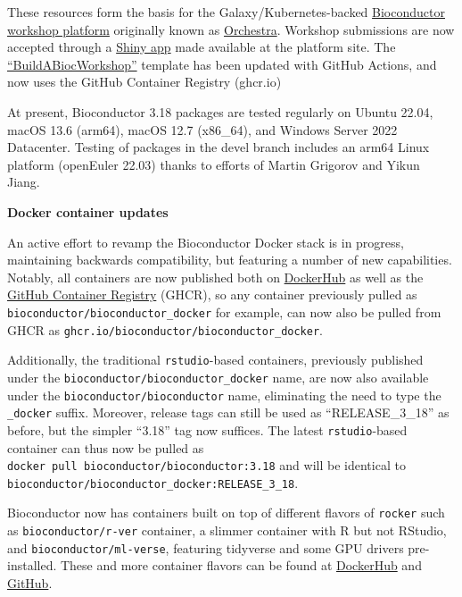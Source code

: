 These resources form the basis for the
Galaxy/Kubernetes-backed \href{https://workshop.bioconductor.org}{Bioconductor workshop platform}
originally known as \href{https://f1000research.com/articles/7-1656}{Orchestra}.
Workshop submissions are now
accepted through a \href{https://github.com/Bioconductor/BiocWorkshopSubmit}{Shiny app} made available at the platform site.
The \href{https://github.com/Bioconductor/BuildABiocWorkshop}{``BuildABiocWorkshop''}
template has been updated
with GitHub Actions, and now uses the GitHub Container Registry (ghcr.io)

At present, Bioconductor 3.18 packages are tested regularly on
Ubuntu 22.04, macOS 13.6 (arm64), macOS 12.7 (x86\_64), and Windows
Server 2022 Datacenter. Testing of packages in the devel branch
includes an arm64 Linux platform (openEuler 22.03) thanks to efforts
of Martin Grigorov and Yikun Jiang.

\textbf{Docker container updates}

An active effort to revamp the Bioconductor Docker stack is in progress, maintaining backwards compatibility, but featuring a number of new capabilities. Notably, all containers are now published both on
\href{https://hub.docker.com/u/bioconductor}{DockerHub} as well as the
\href{https://github.com/orgs/Bioconductor/packages?repo_name=bioconductor_docker}{GitHub Container Registry} (GHCR), so any container previously pulled as \texttt{bioconductor/bioconductor\_docker} for example, can now also be pulled from GHCR as \texttt{ghcr.io/bioconductor/bioconductor\_docker}.

Additionally, the traditional \texttt{rstudio}-based containers, previously published under the \texttt{bioconductor/bioconductor\_docker} name, are now also available under the \texttt{bioconductor/bioconductor} name, eliminating the need to type the \texttt{\_docker} suffix. Moreover, release tags can still be used as ``RELEASE\_3\_18'' as before, but the simpler ``3.18'' tag now suffices. The latest \texttt{rstudio}-based container can thus now be pulled as \texttt{docker\ pull\ bioconductor/bioconductor:3.18} and will be identical to \texttt{bioconductor/bioconductor\_docker:RELEASE\_3\_18}.

Bioconductor now has containers built on top of different flavors of \texttt{rocker} such as \texttt{bioconductor/r-ver} container, a slimmer container with R but not RStudio, and \texttt{bioconductor/ml-verse}, featuring tidyverse and some GPU drivers pre-installed. These and more container flavors can be found at \href{https://hub.docker.com/u/bioconductor}{DockerHub} and \href{https://github.com/orgs/Bioconductor/packages?repo_name=bioconductor_docker}{GitHub}.

